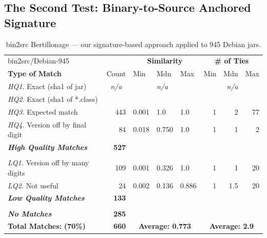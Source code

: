\subsection{The Second Test: Binary-to-Source Anchored Signature}


\begin{table}[h]
    \centering
    \begin{tabular}[htbp]{l|r|lll|rrr}
        bin2src/Debian-945                     &       & \multicolumn{3}{c|}{\textbf{Similarity}}  & \multicolumn{3}{c}{\textbf{\# of Ties}} \\
        \textbf{Type of Match}                 & Count & Min   & Mdn   & Max   & Min & Mdn  & Max  \\
        \hline
        \emph{HQ1.} Exact (sha1 of jar)        & \multicolumn{1}{c|}{\emph{n/a}} & & \emph{n/a} & & & \emph{n/a} &  \\
        \emph{HQ2.} Exact (sha1 of *.class)    & & & & & & & \\
        \emph{HQ3.} Expected match             & 443   & 0.001 & 1.0   & 1.0   & 1   & 2    & 77   \\
        \emph{HQ4.} Version off by final digit &  84   & 0.018 & 0.750 & 1.0   & 1   & 1    &  2   \\
        \emph{\textbf{High Quality Matches}}   & \textbf{527} &       &        &       &      &      &      \\
        & & & & & & & \\
        \emph{LQ1.} Version off by many digits & 109   & 0.001 & 0.326 & 1.0   & 1   & 1    & 20   \\
        \emph{LQ2.} Not useful                 &  24   & 0.002 & 0.136 & 0.886 & 1   & 1.5  & 20   \\
        \emph{\textbf{Low Quality Matches}}    & \textbf{133} &       &        &       &      &      &      \\
        & & & & & & & \\
        \emph{\textbf{No Matches}}             & \textbf{285} &       &        &       &      &      &     \\
        \hline
        \textbf{Total Matches:} \hspace{3em}    \textbf{(70\%)} &  \textbf{660}  & \multicolumn{3}{c|}{\textbf{Average: 0.773}}  & \multicolumn{3}{c}{\textbf{Average: 2.9}} \\
    \end{tabular}
    \caption{bin2src Bertillonage --- our signature-based approach applied to
    945 Debian jars.}
    \label{tab:debianBin2Src}
\end{table}

